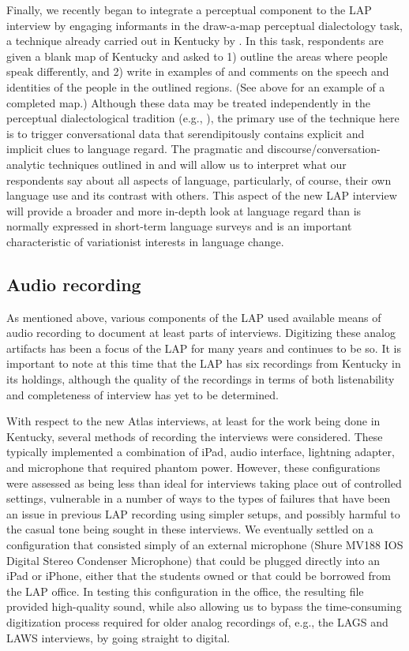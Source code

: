\documentclass[output=paper]{langscibook}
\begin{document}
Finally, we recently began to integrate a perceptual component to the LAP interview by engaging informants in the draw-a-map perceptual dialectology task, a technique already carried out in Kentucky by \citet{Cramer2016}. In this task, respondents are given a blank map of Kentucky and asked to 1) outline the areas where people speak differently, and 2) write in examples of and comments on the speech and identities of the people in the outlined regions. (See  above for an example of a completed map.) Although these data may be treated independently in the perceptual dialectological tradition (e.g., \citealt{Preston2010}), the primary use of the technique here is to trigger conversational data that serendipitously contains explicit and implicit clues to language regard. The pragmatic and discourse\slash conversation\hyp analytic techniques outlined in \citet{NiedzielskiPreston2003} and \citet{Preston2019} will allow us to interpret what our respondents say about all aspects of language, particularly, of course, their own language use and its contrast with others. This aspect of the new LAP interview will provide a broader and more in-depth look at language regard than is normally expressed in short-term language surveys and is an important characteristic of variationist interests in language change. 

\subsection{Audio recording} %
\label{sec:burkette:3.6}
As mentioned above, various components of the LAP used available means of audio recording to document at least parts of interviews. Digitizing these analog artifacts has been a focus of the LAP for many years and continues to be so. It is important to note at this time that the LAP has six recordings from Kentucky in its holdings, although the quality of the recordings in terms of both listenability and completeness of interview has yet to be determined.

With respect to the new Atlas interviews, at least for the work being done in Kentucky, several methods of recording the interviews were considered. These typically implemented a combination of iPad, audio interface, lightning adapter, and microphone that required phantom power. However, these configurations were assessed as being less than ideal for interviews taking place out of controlled settings, vulnerable in a number of ways to the types of failures that have been an issue in previous LAP recording using simpler setups, and possibly harmful to the casual tone being sought in these interviews. We eventually settled on a configuration that consisted simply of an external microphone (Shure MV188 IOS Digital Stereo Condenser Microphone) that could be plugged directly into an iPad or iPhone, either that the students owned or that could be borrowed from the LAP office. In testing this configuration in the office, the resulting file provided high-quality sound, while also allowing us to bypass the time-consuming digitization process required for older analog recordings of, e.g., the LAGS and LAWS interviews, by going straight to digital. 
\end{document}
